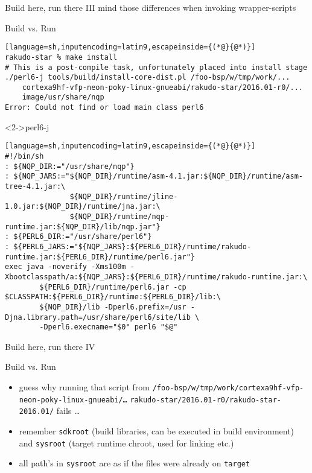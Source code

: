 \documentclass[ngerman,xcolor={table,dvipsnames},smaller,compress,hyperref={bookmarks,colorlinks}]{beamer}%
\begin{document}
\begin{frame}[fragile]{Build here, run there III}
mind those differences when invoking wrapper-scripts
\begin{block}{Build vs. Run}
\scriptsize
\begin{lstlisting}[language=sh,inputencoding=latin9,escapeinside={(*@}{@*)}]
rakudo-star % make install
# This is a post-compile task, unfortunately placed into install stage
./perl6-j tools/build/install-core-dist.pl /foo-bsp/w/tmp/work/...
    cortexa9hf-vfp-neon-poky-linux-gnueabi/rakudo-star/2016.01-r0/...
    image/usr/share/nqp
Error: Could not find or load main class perl6
\end{lstlisting}
\end{block}

\begin{block}<2->{perl6-j}
\tiny
\begin{lstlisting}[language=sh,inputencoding=latin9,escapeinside={(*@}{@*)}]
#!/bin/sh
: ${NQP_DIR:="/usr/share/nqp"}
: ${NQP_JARS:="${NQP_DIR}/runtime/asm-4.1.jar:${NQP_DIR}/runtime/asm-tree-4.1.jar:\
               ${NQP_DIR}/runtime/jline-1.0.jar:${NQP_DIR}/runtime/jna.jar:\
               ${NQP_DIR}/runtime/nqp-runtime.jar:${NQP_DIR}/lib/nqp.jar"}
: ${PERL6_DIR:="/usr/share/perl6"}
: ${PERL6_JARS:="${NQP_JARS}:${PERL6_DIR}/runtime/rakudo-runtime.jar:${PERL6_DIR}/runtime/perl6.jar"}
exec java -noverify -Xms100m -Xbootclasspath/a:${NQP_JARS}:${PERL6_DIR}/runtime/rakudo-runtime.jar:\
        ${PERL6_DIR}/runtime/perl6.jar -cp $CLASSPATH:${PERL6_DIR}/runtime:${PERL6_DIR}/lib:\
        ${NQP_DIR}/lib -Dperl6.prefix=/usr -Djna.library.path=/usr/share/perl6/site/lib \
        -Dperl6.execname="$0" perl6 "$@"
\end{lstlisting}

\end{block}
\end{frame}

\begin{frame}[fragile]{Build here, run there IV}
\begin{block}{Build vs. Run}
\begin{itemize}
\item guess why running that script from \texttt{/foo-bsp/w/tmp/work/cortexa9hf-vfp-neon-poky-linux-gnueabi/\ldots} \texttt{rakudo-star/2016.01-r0/rakudo-star-2016.01/} fails \ldots
\item<2-> remember \texttt{sdkroot} (build libraries, can be executed in build environment) and \texttt{sysroot} (target runtime chroot, used for linking etc.)
\item<3-> all path's in \texttt{sysroot} are as if the files were already on \texttt{target}
\end{itemize}
\end{block}
\end{frame}
\end{document}
